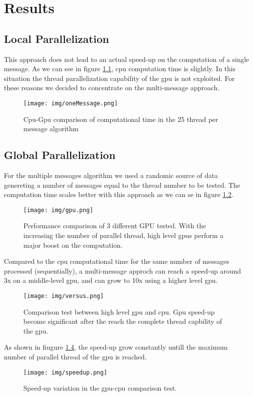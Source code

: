 \chapter{Results} \label{chap:results}
\section{Local Parallelization}
This approach does not lead to an actual speed-up on the computation of a single message. As we can see in figure \ref{fig:singleMessage}, cpu computation time is slightly.
In this situation the thread parallelization capability of the gpu is not exploited. For these reasons we decided to concentrate on the multi-message approach.
\begin{figure}[h!bt]
	\centerline{\texttt{[image: img/oneMessage.png]}}
	\caption{Cpu-Gpu comparison of computational time in the 25 thread per message algorithm}
	\label{fig:singleMessage}
\end{figure}

\newpage

\section{Global Parallelization}
For the multiple messages algorithm we used a randomic source of data genereting a number of messages equal to the thread number to be tested.
The computation time scales better with this approach as we can se in figure \ref{fig:gpuComparison}.  
\begin{figure}[h!bt]
	\centerline{\texttt{[image: img/gpu.png]}}
	\caption{Performance comparison of 3 different GPU tested. With the increasing the number of parallel thread, high level gpus perform a major boost on the computation.}
	\label{fig:gpuComparison}
\end{figure}

\newpage

Compared to the cpu computational time for the same number of messages processed (sequentially), a multi-message approch can reach a speed-up around 3x on a middle-level gpu, and can grow to 10x using a higher level gpu.
\begin{figure}[h!bt]
	\centerline{\texttt{[image: img/versus.png]}}
	\caption{Comparison test between high level gpu and cpu. Gpu speed-up become significant after the reach the complete thread capbility of the gpu.}
	\label{fig:CPUVersusGPU}
\end{figure}

\newpage

As shown in fiugure \ref{fig:speedup}, the speed-up grow constantly untill the maximum number of parallel thread of the gpu is reached.
\begin{figure}[h!bt]
	\centerline{\texttt{[image: img/speedup.png]}}
	\caption{Speed-up variation in the gpu-cpu comparison test.}
	\label{fig:speedup}
\end{figure}


